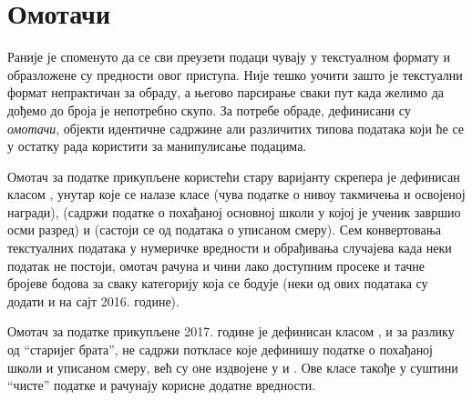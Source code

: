 \section{Омотачи}

Раније је споменуто да се сви преузети подаци чувају у текстуалном формату и образложене су предности овог приступа. Није тешко уочити зашто је текстуални формат непрактичан за обраду, а његово парсирање сваки пут када желимо да дођемо до броја је непотребно скупо. За потребе обраде, дефинисани су \emph{омотачи}, објекти идентичне садржине али различитих типова података који ће се у остатку рада користити за манипулисање подацима.

Омотач за податке прикупљене користећи стару варијанту скрепера је дефинисан класом , унутар које се налазе класе  (чува податке о нивоу такмичења и освојеној награди),  (садржи податке о похађаној основној школи у којој је ученик завршио осми разред) и  (састоји се од података о уписаном смеру). Сем конвертовања текстуалних података у нумеричке вредности и обрађивања случајева када неки податак не постоји, омотач рачуна и чини лако доступним просеке и тачне бројеве бодова за сваку категорију која се бодује (неки од ових података су додати и на сајт 2016. године).

Омотач за податке прикупљене 2017. године је дефинисан класом , и за разлику од \enquote{старијег брата}, не садржи поткласе које дефинишу податке о похађаној школи и уписаном смеру, већ су оне издвојене у  и . Ове класе такође у суштини \enquote{чисте} податке и рачунају корисне додатне вредности.